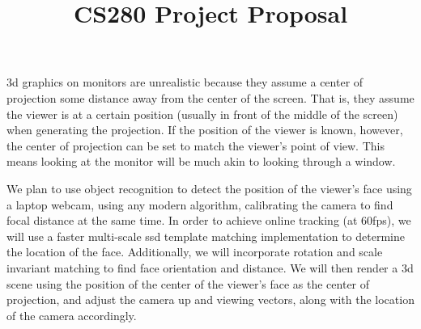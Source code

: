 \documentclass[11pt]{article}
\title{CS280 Project Proposal}
\date{}
\begin{document}
\maketitle
3d graphics on monitors are unrealistic because they assume a center of projection some distance away from the center of the screen. That is, they assume the viewer is at a certain position (usually in front of the middle of the screen) when generating the projection. If the position of the viewer is known, however, the center of projection can be set to match the viewer's point of view. This means looking at the monitor will be much akin to looking through a window. 

We plan to use object recognition to detect the position of the viewer's face using a laptop webcam, using any modern algorithm, calibrating the camera to find focal distance at the same time. In order to achieve online tracking (at 60fps), we will use a faster multi-scale ssd template matching implementation to determine the location of the face. Additionally, we will incorporate rotation and scale invariant matching to find face orientation and distance. We will then render a 3d scene using the position of the center of the viewer's face as the center of projection, and adjust the camera up and viewing vectors, along with the location of the camera accordingly.
\end{document}
